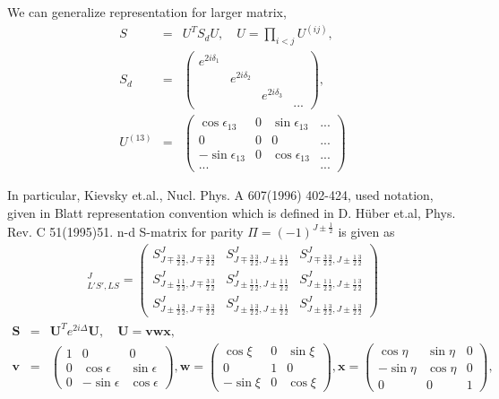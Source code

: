 \documentclass[10pt]{book}
\def\bm{\boldsymbol}
\newcommand{\bea}{\begin{eqnarray}}
\newcommand{\eea}{\end{eqnarray}}
\newcommand{\no}{\nonumber \\}
\begin{document}
We can generalize representation for larger matrix,
\bea
S&=&U^T S_d U,\quad U= \prod_{i<j} U^{(ij)}, \no
S_d&=& \left(\begin{array}{cccc} e^{2i\delta_1} &  &  &  \\
                                     &e^{2i\delta_2} & &\\
                                     &  & e^{2i\delta_3} & \\
                                     &  &  & ...   
\end{array}
\right),\no
U^{(13)}&=& \left(\begin{array}{cccc} 
   \cos\epsilon_{13} & 0 &\sin\epsilon_{13} & ... \\
   0                 & 0  &  0   & ...\\
   -\sin\epsilon_{13} & 0 & \cos\epsilon_{13} &... \\
   ... &   &   &     ...
\end{array}
\right)
\eea

In particular, 
Kievsky et.al., Nucl. Phys. A 607(1996) 402-424,
 used notation,
 given in  Blatt representation convention which is defined in 
    D. H\"uber et.al, Phys. Rev. C 51(1995)51.
      n-d S-matrix for parity $\Pi=(-1)^{J\pm\frac{1}{2}}$
      is given as
\bea
[S]_{L'S',LS}^J=\left(\begin{array}{ccc}
    S^J_{J\mp\frac{3}{2} \frac{3}{2},J\mp\frac{3}{2}\frac{3}{2}}&
    S^J_{J\mp\frac{3}{2} \frac{3}{2},J\pm\frac{1}{2}\frac{1}{2}}&
    S^J_{J\mp\frac{3}{2} \frac{3}{2},J\pm\frac{1}{2}\frac{3}{2}}\\
    S^J_{J\pm\frac{1}{2} \frac{1}{2},J\mp\frac{3}{2}\frac{3}{2}}&
    S^J_{J\pm\frac{1}{2} \frac{1}{2},J\pm\frac{1}{2}\frac{1}{2}}&
    S^J_{J\pm\frac{1}{2} \frac{1}{2},J\pm\frac{1}{2}\frac{3}{2}}\\
    S^J_{J\pm\frac{1}{2} \frac{3}{2},J\mp\frac{3}{2}\frac{3}{2}}&
    S^J_{J\pm\frac{1}{2} \frac{3}{2},J\pm\frac{1}{2}\frac{1}{2}}&
    S^J_{J\pm\frac{1}{2} \frac{3}{2},J\pm\frac{1}{2}\frac{3}{2}} 
\end{array}\right)
\eea
\bea
{\bm S}&=&{\bm U}^T e^{2i\Delta} {\bm U},\quad
{\bm U}={\bm{v w x}},\no
{\bm v}&=&\left(\begin{array}{ccc}
            1 & 0 & 0 \\ 0 &\cos\epsilon&\sin\epsilon \\
            0 & -\sin\epsilon & \cos\epsilon   
\end{array}\right),
{\bm w}=\left(\begin{array}{ccc}
            \cos\xi & 0 & \sin\xi \\ 0 &1 &0  \\
            -\sin\xi & 0 & \cos\xi   
\end{array}\right),
{\bm x}=\left(\begin{array}{ccc}
            \cos\eta & \sin\eta & 0 \\ 
            -\sin\eta &\cos\eta&0 \\
            0 & 0 & 1   
\end{array}\right),
\eea
\end{document}
